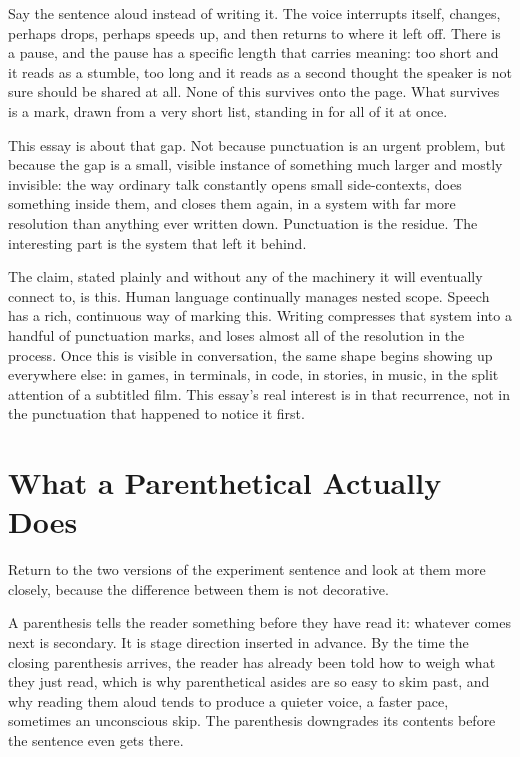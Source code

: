 \documentclass[11pt]{article}
\begin{document}
Say the sentence aloud instead of writing it. The voice interrupts itself, changes, perhaps drops, perhaps speeds up, and then returns to where it left off. There is a pause, and the pause has a specific length that carries meaning: too short and it reads as a stumble, too long and it reads as a second thought the speaker is not sure should be shared at all. None of this survives onto the page. What survives is a mark, drawn from a very short list, standing in for all of it at once.

This essay is about that gap. Not because punctuation is an urgent problem, but because the gap is a small, visible instance of something much larger and mostly invisible: the way ordinary talk constantly opens small side-contexts, does something inside them, and closes them again, in a system with far more resolution than anything ever written down. Punctuation is the residue. The interesting part is the system that left it behind.

The claim, stated plainly and without any of the machinery it will eventually connect to, is this. Human language continually manages nested scope. Speech has a rich, continuous way of marking this. Writing compresses that system into a handful of punctuation marks, and loses almost all of the resolution in the process. Once this is visible in conversation, the same shape begins showing up everywhere else: in games, in terminals, in code, in stories, in music, in the split attention of a subtitled film. This essay's real interest is in that recurrence, not in the punctuation that happened to notice it first.

\section{What a Parenthetical Actually Does}

Return to the two versions of the experiment sentence and look at them more closely, because the difference between them is not decorative.

A parenthesis tells the reader something before they have read it: whatever comes next is secondary. It is stage direction inserted in advance. By the time the closing parenthesis arrives, the reader has already been told how to weigh what they just read, which is why parenthetical asides are so easy to skim past, and why reading them aloud tends to produce a quieter voice, a faster pace, sometimes an unconscious skip. The parenthesis downgrades its contents before the sentence even gets there.
\end{document}
